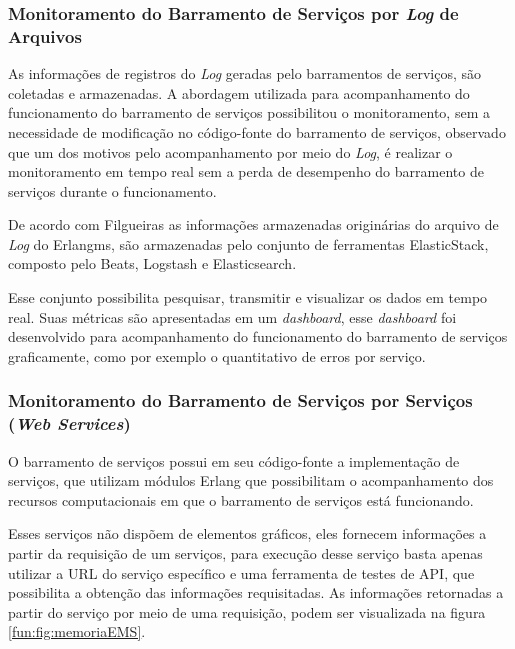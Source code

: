 \subsubsection{Monitoramento do Barramento de Serviços por \textit{Log} de Arquivos}

As informações de registros do \textit{Log} geradas pelo barramentos de serviços, são coletadas e armazenadas. A abordagem utilizada para acompanhamento do funcionamento do barramento de serviços possibilitou o monitoramento, sem a necessidade de modificação no código-fonte do barramento de serviços, observado que um dos motivos pelo acompanhamento por meio do \textit{Log}, é realizar o monitoramento em tempo real sem a perda de desempenho  do barramento de serviços durante o funcionamento. 

De acordo com Filgueiras\cite{filgueirasmonitoramento}  as informações armazenadas originárias do arquivo de \textit{Log} do Erlangms, são armazenadas pelo conjunto de ferramentas ElasticStack, composto pelo Beats, Logstash e Elasticsearch. 

Esse conjunto possibilita pesquisar, transmitir e visualizar os dados em tempo real\cite{filgueirasmonitoramento}. Suas métricas são apresentadas em um \textit{dashboard}, esse \textit{dashboard} foi desenvolvido para acompanhamento do funcionamento do barramento de serviços graficamente, como por exemplo o quantitativo de erros por serviço.



\subsubsection{Monitoramento do Barramento de Serviços por Serviços (\textit{Web Services})}
O barramento de serviços possui em seu código-fonte a implementação de serviços, que utilizam módulos Erlang que possibilitam o acompanhamento dos recursos computacionais em que o barramento de serviços está funcionando. 

Esses serviços não dispõem de elementos gráficos, eles fornecem informações a partir da requisição de um serviços, para execução desse serviço basta apenas utilizar a \acrshort{URL} do serviço específico e uma ferramenta de testes de \acrshort{API}, que possibilita a obtenção das informações requisitadas. 
As informações retornadas a partir do serviço por meio de uma requisição, podem ser visualizada na figura \ref{fun:fig:memoriaEMS}.

